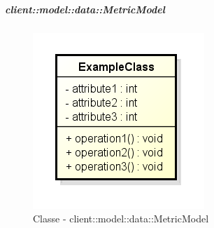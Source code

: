		\subparagraph{client::model::data::MetricModel} %
		\label{subp:client_model_data_metricmodel}
			\begin{figure}[htbp]
				\centering
				\centerline{\includegraphics[scale=0.7]{./images/client/classes/example_class.png}}
				\caption{Classe - client::model::data::MetricModel}
			\end{figure}
